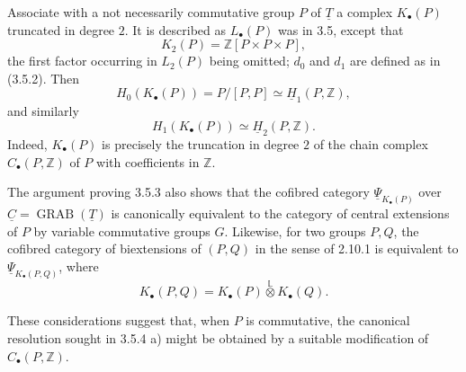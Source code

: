 Associate with a not necessarily commutative group $P$ of
$\underline T$ a complex $K_\bullet(P)$ truncated in degree $2$.
It is described as $L_\bullet(P)$ was in 3.5, except that
\[
 K_2(P)=\mathbb Z[P\times P\times P],
\]
the first factor occurring in $L_2(P)$ being omitted; $d_0$ and
$d_1$ are defined as in (3.5.2).  Then
\[
 H_0(K_\bullet(P))=P/[P,P]
 \simeq\underline H_1(P,\mathbb Z),
\]
and similarly
\[
 H_1(K_\bullet(P))\simeq\underline H_2(P,\mathbb Z).
\]
Indeed, $K_\bullet(P)$ is precisely the truncation in degree $2$ of
the chain complex $C_\bullet(P,\mathbb Z)$ of $P$ with coefficients
in $\mathbb Z$.

The argument proving 3.5.3 also shows that the cofibred category
$\underline\Psi_{K_\bullet(P)}$ over
$\underline C=\operatorname{GRAB}(\underline T)$ is canonically
equivalent to the category of central extensions of $P$ by variable
commutative groups $G$.  Likewise, for two groups $P,Q$, the
cofibred category of biextensions of $(P,Q)$ in the sense of 2.10.1
is equivalent to $\underline\Psi_{K_\bullet(P,Q)}$, where
\[
 K_\bullet(P,Q)
 =
 K_\bullet(P)\mathbin{\overset{\mathbb L}{\otimes}}K_\bullet(Q).
\]

These considerations suggest that, when $P$ is commutative, the
canonical resolution sought in 3.5.4 a) might be obtained by a
suitable modification of $C_\bullet(P,\mathbb Z)$.
